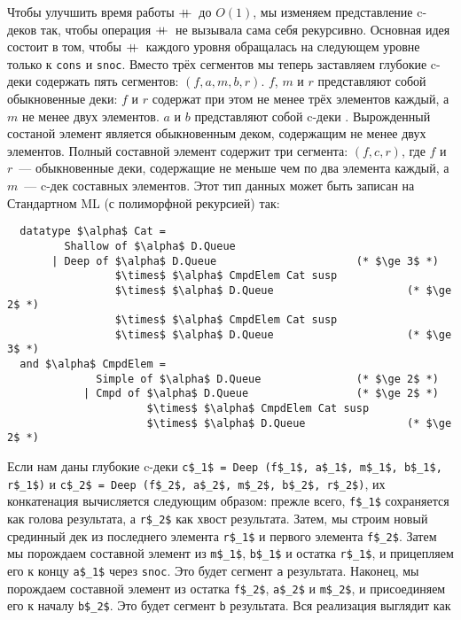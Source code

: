 Чтобы улучшить время работы $+\!\!\!+\,$ до $O(1)$, мы изменяем
представление c-деков так, чтобы операция $+\!\!\!+\,$ не вызывала сама
себя рекурсивно. Основная идея состоит в том, чтобы $+\!\!\!+\,$ каждого уровня
обращалась на следующем уровне только к \lstinline!cons! и
\lstinline!snoc!. Вместо трёх сегментов мы теперь заставляем глубокие
c-деки содержать пять сегментов: $(f, a, m, b, r)$. $f$, $m$ и $r$
представляют собой обыкновенные деки: $f$ и $r$ содержат при этом не
менее трёх элементов каждый, а $m$ не менее двух элементов. $a$ и $b$
представляют собой c-деки . Вырожденный состаной элемент является обыкновенным деком,
содержащим не менее двух элементов.  Полный составной элемент содержит
три сегмента: $(f, c, r)$, где $f$ и $r$~--- обыкновенные деки,
содержащие не меньше чем по два элемента каждый, а $m$~--- c-дек
составных элементов. Этот тип данных может быть записан на Стандартном
ML (с полиморфной рекурсией) так:
\begin{lstlisting}
  datatype $\alpha$ Cat =
         Shallow of $\alpha$ D.Queue
       | Deep of $\alpha$ D.Queue                      (* $\ge 3$ *)
                 $\times$ $\alpha$ CmpdElem Cat susp
                 $\times$ $\alpha$ D.Queue                     (* $\ge 2$ *)
                 $\times$ $\alpha$ CmpdElem Cat susp
                 $\times$ $\alpha$ D.Queue                     (* $\ge 3$ *)
  and $\alpha$ CmpdElem = 
              Simple of $\alpha$ D.Queue               (* $\ge 2$ *)
            | Cmpd of $\alpha$ D.Queue                 (* $\ge 2$ *)
                      $\times$ $\alpha$ CmpdElem Cat susp
                      $\times$ $\alpha$ D.Queue                (* $\ge 2$ *)
\end{lstlisting}
Если нам даны глубокие c-деки 
\lstinline!c$_1$ = Deep (f$_1$, a$_1$, m$_1$, b$_1$, r$_1$)! и 
\lstinline!c$_2$ = Deep (f$_2$, a$_2$, m$_2$, b$_2$, r$_2$)!, их
конкатенация вычисляется следующим образом: прежле всего,
\lstinline!f$_1$! сохраняется как голова результата, а
\lstinline!r$_2$! как хвост результата. Затем, мы строим новый
срединный дек из последнего элемента \lstinline!r$_1$! и первого
элемента \lstinline!f$_2$!.  Затем мы порождаем составной элемент из
\lstinline!m$_1$!, \lstinline!b$_1$! и остатка \lstinline!r$_1$!, и
прицепляем его к концу \lstinline!a$_1$! через \lstinline!snoc!. Это
будет сегмент \lstinline!a! результата. Наконец, мы порождаем
составной элемент из остатка \lstinline!f$_2$!, \lstinline!a$_2$! и
\lstinline!m$_2$!, и присоединяем его к началу \lstinline!b$_2$!. Это
будет сегмент \lstinline!b! результата. Вся реализация выглядит как
